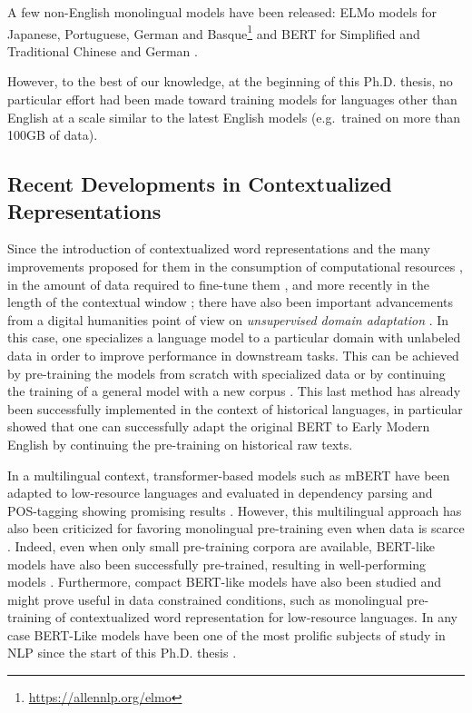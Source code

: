 A few non-English monolingual models have been released: ELMo models for Japanese, Portuguese, German and Basque\footnote{\url{https://allennlp.org/elmo}} and BERT for Simplified and Traditional Chinese \citep{devlin-etal-2019-bert} and German \citep{chan-etal-2019-german}.

However, to the best of our knowledge, at the beginning of this Ph.D. thesis, no particular effort had been made toward training models for languages other than English at a scale similar to the latest English models (e.g.~\roberta trained on more than 100GB of data).

\subsection{Recent Developments in Contextualized Representations}
Since the introduction of contextualized word representations \citep{peters-etal-2018-deep,akbik-etal-2018-contextual,devlin-etal-2019-bert} and the many improvements proposed for them in the consumption of computational resources \citep{clark-etal-2020-electra}, in the amount of data required to fine-tune them \citep{raffel-etal-2020-exploring}, and more recently in the length of the contextual window \citep{xiong-etal-2021-nystromformer}; there have also been important advancements from a digital humanities point of view on \emph{unsupervised domain adaptation} \citep{ramponi-plank-2020-neural}. In this case, one specializes a language model to a particular domain with unlabeled data in order to improve performance in downstream tasks. This can be achieved by  pre-training the models from scratch with specialized data \citep{beltagy-etal-2019-scibert} or by continuing the training of a general model with a new corpus \citep{lee-etal-2019-BioBERT, peng-etal-2019-transfer}. This last method has already been successfully implemented in the context of historical languages, in particular \citet{han-eisenstein-2019-unsupervised} showed that one can successfully adapt the original BERT \citep{devlin-etal-2019-bert} to Early Modern English by continuing the pre-training on historical raw texts.

In a multilingual context, transformer-based models such as mBERT have been adapted to low-resource languages and evaluated in dependency parsing and POS-tagging showing promising results \citep{chau-etal-2020-parsing, muller-etal-2021-unseen, gururangan-etal-2020-dont, wang-etal-2020-extending}. However, this multilingual approach has also been criticized for favoring monolingual pre-training even when data is scarce \citep{virtanen-etal-2019-multilingual, ortiz-suarez-etal-2020-monolingual}. Indeed, even when only small pre-training corpora are available, BERT-like models have also been successfully pre-trained, resulting in well-performing models \citep{micheli-etal-2020-importance}. Furthermore, compact BERT-like models have also been studied \citep{turc-etal-2019-well} and might prove useful in data constrained conditions, such as monolingual pre-training of contextualized word representation for low-resource languages. In any case BERT-Like models have been one of the most prolific subjects of study in NLP since the start of this Ph.D. thesis \citep{rogers-etal-2020-primer}.

